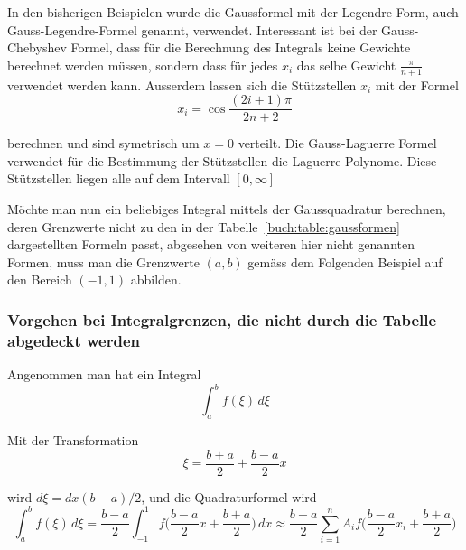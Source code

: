 In den bisherigen Beispielen wurde die Gaussformel mit der Legendre Form, auch Gauss-Legendre-Formel genannt, verwendet.
Interessant ist bei der Gauss-Chebyshev Formel, 
dass für die Berechnung des Integrals keine Gewichte berechnet werden müssen,
sondern dass für jedes $x_{i}$ das selbe Gewicht $\frac{\pi}{n+1}$ verwendet werden kann.
Ausserdem lassen sich die Stützstellen $x_{i}$ mit der Formel
\begin{equation}
    x_{i} = \cos \frac{(2i+1)\pi}{2n+2}
\end{equation}

berechnen und sind symetrisch um $x = 0$ verteilt.
Die Gauss-Laguerre Formel verwendet für die Bestimmung der Stützstellen die Laguerre-Polynome.
Diese Stützstellen liegen alle auf dem Intervall $[0, \infty]$

Möchte man nun ein beliebiges Integral mittels der Gaussquadratur berechnen,
deren Grenzwerte nicht zu den in der Tabelle~\ref{buch:table:gaussformen} 
dargestellten Formeln passt, 
abgesehen von weiteren hier nicht genannten Formen, 
muss man die Grenzwerte $(a, b)$ gemäss dem Folgenden Beispiel
auf den Bereich $(-1, 1)$ abbilden.

\subsubsection{Vorgehen bei Integralgrenzen, die nicht durch die Tabelle abgedeckt werden}

Angenommen man hat ein Integral
\begin{equation}
    \int_{a}^{b}f(\xi)\,d\xi
\end{equation}

Mit der Transformation
\begin{equation}
    \xi = \frac{b + a}{2} + \frac{b - a}{2} x    
\end{equation}

wird $d\xi = dx(b - a)/2$, und die Quadraturformel wird
\begin{equation}
    \int_{a}^{b}f(\xi)\,d\xi 
    =
    \frac{b - a}{2} \int_{-1}^{1}f\bigg(\frac{b - a}{2}x + \frac{b + a}{2}\bigg)\, dx 
    \approx
     \frac{b - a}{2} \sum_{i=1}^{n} A_{i}f\bigg(\frac{b - a}{2}x_{i} + \frac{b + a}{2}\bigg)
\end{equation}

